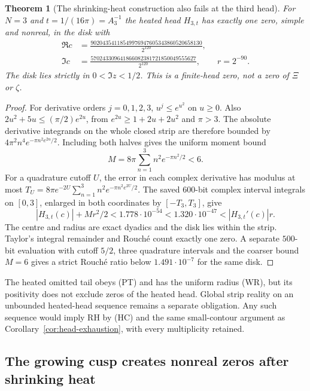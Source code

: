 \documentclass[11pt]{article}
\newtheorem{theorem}{Theorem}
\theoremstyle{remark}\newtheorem{remark}[theorem]{Remark}
\begin{document}
\begin{theorem}[The shrinking-heat construction also fails at the third head]
\label{thm:heated-third-certificate}
For $N=3$ and $t=1/(16\pi)=A_3^{-1}$ the heated head $H_{3,t}$ has
exactly one zero, simple and nonreal, in the disk with
\[
 \begin{aligned}
 \Re c&=\frac{90204354118549976947605343860520658130}{2^{120}},\\
 \Im c&=\frac{570243309641866082381721850049555627}{2^{120}},
 \qquad r=2^{-90}.
 \end{aligned}                                         \tag{WD}
\]
The disk lies strictly in $0<\Im z<1/2$.
This is a finite-head zero, not a zero of $\Xi$ or $\zeta$.
\end{theorem}
\begin{proof}
For derivative orders $j=0,1,2,3$, $u^j\le e^{u^2}$ on $u\ge0$.
Also $2u^2+5u\le(\pi/2)e^{2u}$, from
$e^{2u}\ge1+2u+2u^2$ and $\pi>3$.
The absolute derivative integrands on the whole closed strip are
therefore bounded by $4\pi^2n^4e^{-\pi n^2e^{2u}/2}$.
Including both halves gives the uniform moment bound
\[
 M=8\pi\sum_{n=1}^3 n^2e^{-\pi n^2/2}<6.
\]
For a quadrature cutoff $U$, the error in each complex derivative
has modulus at most
$T_U=8\pi e^{-2U}\sum_{n=1}^3n^2e^{-\pi n^2e^{2U}/2}$.
The saved $600$-bit complex interval integrals on $[0,3]$,
enlarged in both coordinates by $[-T_3,T_3]$, give
\[
 |H_{3,t}(c)|+Mr^2/2<1.778\cdot10^{-54}
             <1.320\cdot10^{-47}<|H_{3,t}'(c)|r .
\]
The centre and radius are exact dyadics and the disk lies within the strip.
Taylor's integral remainder and Rouch\'e count exactly one zero.
A separate $500$-bit evaluation with cutoff $5/2$, three quadrature intervals
and the coarser bound $M=6$ gives a strict Rouch\'e ratio below
$1.491\cdot10^{-7}$ for the same disk.
\end{proof}

The heated omitted tail obeys (PT) and has the uniform radius (WR),
but its positivity does not exclude zeros of the heated head.
Global strip reality on an unbounded
heated-head sequence remains a separate obligation. Any such sequence
would imply RH by (HC) and the same small-contour argument as
Corollary~\ref{cor:head-exhaustion}, with every multiplicity retained.

\subsection{The growing cusp creates nonreal zeros after shrinking heat}
\end{document}
